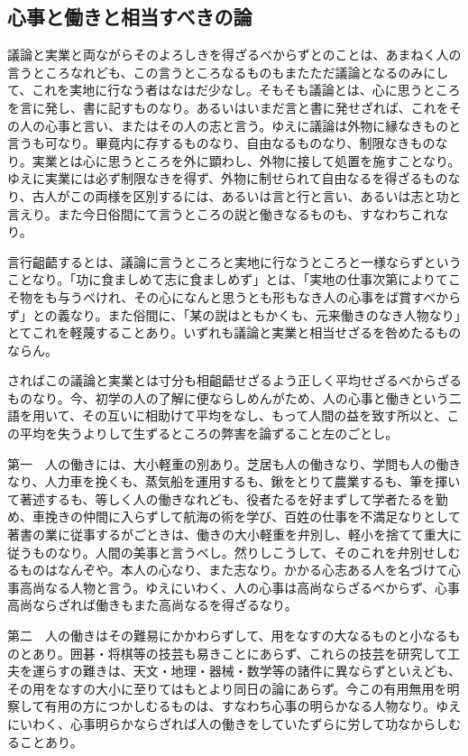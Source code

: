 \documentclass[a4paper, platex, dvipdfmx]{jsarticle}
\begin{document}
\subsection{心事と働きと相当すべきの論}
議論と実業と両ながらそのよろしきを得ざるべからずとのことは、あまねく人の言うところなれども、この言うところなるものもまたただ議論となるのみにして、これを実地に行なう者はなはだ少なし。そもそも議論とは、心に思うところを言に発し、書に記すものなり。あるいはいまだ言と書に発せざれば、これをその人の心事と言い、またはその人の志と言う。ゆえに議論は外物に縁なきものと言うも可なり。畢竟内に存するものなり、自由なるものなり、制限なきものなり。実業とは心に思うところを外に顕わし、外物に接して処置を施すことなり。ゆえに実業には必ず制限なきを得ず、外物に制せられて自由なるを得ざるものなり、古人がこの両様を区別するには、あるいは言と行と言い、あるいは志と功と言えり。また今日俗間にて言うところの説と働きなるものも、すなわちこれなり。

言行齟齬するとは、議論に言うところと実地に行なうところと一様ならずということなり。「功に食ましめて志に食ましめず」とは、「実地の仕事次第によりてこそ物をも与うべけれ、その心になんと思うとも形もなき人の心事をば賞すべからず」との義なり。また俗間に、「某の説はともかくも、元来働きのなき人物なり」とてこれを軽蔑することあり。いずれも議論と実業と相当せざるを咎めたるものならん。

さればこの議論と実業とは寸分も相齟齬せざるよう正しく平均せざるべからざるものなり。今、初学の人の了解に便ならしめんがため、人の心事と働きという二語を用いて、その互いに相助けて平均をなし、もって人間の益を致す所以と、この平均を失うよりして生ずるところの弊害を論ずること左のごとし。

第一　人の働きには、大小軽重の別あり。芝居も人の働きなり、学問も人の働きなり、人力車を挽くも、蒸気船を運用するも、鍬をとりて農業するも、筆を揮いて著述するも、等しく人の働きなれども、役者たるを好まずして学者たるを勤め、車挽きの仲間に入らずして航海の術を学び、百姓の仕事を不満足なりとして著書の業に従事するがごときは、働きの大小軽重を弁別し、軽小を捨てて重大に従うものなり。人間の美事と言うべし。然りしこうして、そのこれを弁別せしむるものはなんぞや。本人の心なり、また志なり。かかる心志ある人を名づけて心事高尚なる人物と言う。ゆえにいわく、人の心事は高尚ならざるべからず、心事高尚ならざれば働きもまた高尚なるを得ざるなり。

第二　人の働きはその難易にかかわらずして、用をなすの大なるものと小なるものとあり。囲碁・将棋等の技芸も易きことにあらず、これらの技芸を研究して工夫を運らすの難きは、天文・地理・器械・数学等の諸件に異ならずといえども、その用をなすの大小に至りてはもとより同日の論にあらず。今この有用無用を明察して有用の方につかしむるものは、すなわち心事の明らかなる人物なり。ゆえにいわく、心事明らかならざれば人の働きをしていたずらに労して功なからしむることあり。
\end{document}
